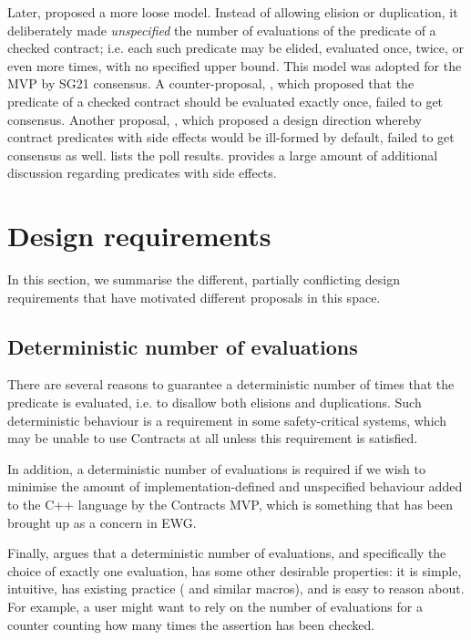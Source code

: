 Later, \cite{P2751R1} proposed a more loose model. Instead of allowing elision or duplication, it deliberately made \emph{unspecified} the number of evaluations of the predicate of a checked contract; i.e. each such predicate may be elided, evaluated once, twice, or even more times, with no specified upper bound. This model was adopted for the MVP by SG21 consensus. A counter-proposal, \cite{P2756R0}, which proposed that the predicate of a checked contract should be evaluated exactly once, failed to get consensus. Another proposal, \cite{P2680R1}, which proposed a design direction whereby contract predicates with side effects would be ill-formed by default, failed to get consensus as well. \cite{P2751R1} lists the poll results. \cite{P2570R2} provides a large amount of additional discussion regarding predicates with side effects.


\section{Design requirements}
\label{sec:reqs}

In this section, we summarise the different, partially conflicting design requirements that have motivated different proposals in this space.

\subsection{Deterministic number of evaluations}
\label{subsec:determ}

There are several reasons to guarantee a deterministic number of times that the predicate is evaluated, i.e. to disallow both elisions and duplications. Such deterministic behaviour is a requirement in some safety-critical systems, which may be unable to use Contracts at all unless this requirement is satisfied.

In addition, a deterministic number of evaluations is required if we wish to minimise the amount of implementation-defined and unspecified behaviour added to the C++ language by the Contracts MVP, which is something that has been brought up as a concern in EWG.

Finally, \cite{P2756R0} argues that a deterministic number of evaluations, and specifically the choice of exactly one evaluation, has some other desirable properties: it is simple, intuitive, has existing practice ( and similar macros), and is easy to reason about. For example, a user might want to rely on the number of evaluations for a counter counting how many times the assertion has been checked. 

